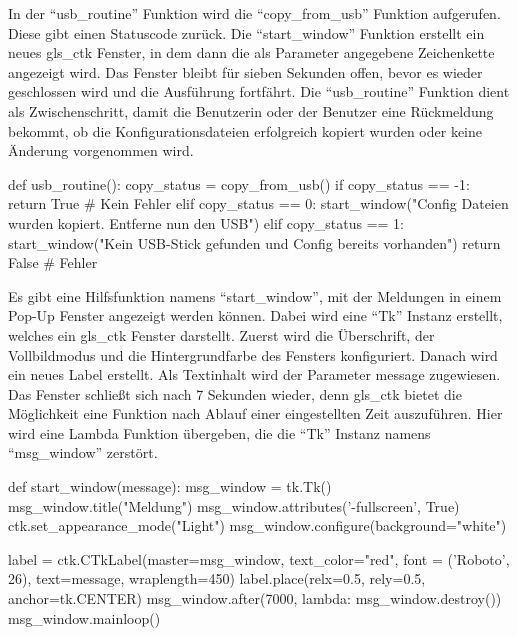 In der \enquote{usb\_routine} Funktion wird die \enquote{copy\_from\_usb} Funktion aufgerufen. Diese gibt einen Statuscode zurück. Die \enquote{start\_window} Funktion erstellt ein neues \gls{gls_ctk} Fenster, in dem dann die als Parameter angegebene Zeichenkette angezeigt wird. Das Fenster bleibt für sieben Sekunden offen, bevor es wieder geschlossen wird und die Ausführung fortfährt. Die \enquote{usb\_routine} Funktion dient als Zwischenschritt, damit die Benutzerin oder der Benutzer eine Rückmeldung bekommt, ob die Konfigurationsdateien erfolgreich kopiert wurden oder keine Änderung vorgenommen wird.

\begin{pythoncode}
def usb_routine():
	copy_status = copy_from_usb()
	if copy_status == -1:
		return True # Kein Fehler
	elif copy_status == 0:
		start_window("Config Dateien wurden kopiert. Entferne nun den USB")   
	elif copy_status == 1: 
		start_window("Kein USB-Stick gefunden und Config bereits vorhanden")  
	return False # Fehler
\end{pythoncode}

Es gibt eine Hilfsfunktion namens \enquote{start\_window}, mit der Meldungen in einem Pop-Up Fenster angezeigt werden können. Dabei wird eine \enquote{Tk} Instanz erstellt, welches ein \gls{gls_ctk} Fenster darstellt. Zuerst wird die Überschrift, der Vollbildmodus und die Hintergrundfarbe des Fensters konfiguriert. Danach wird ein neues Label erstellt. Als Textinhalt wird der Parameter message zugewiesen. Das Fenster schließt sich nach 7 Sekunden wieder, denn \gls{gls_ctk} bietet die Möglichkeit eine Funktion nach Ablauf einer eingestellten Zeit auszuführen. Hier wird eine Lambda Funktion übergeben, die die \enquote{Tk} Instanz namens \enquote{msg\_window} zerstört.
\begin{pythoncode}
def start_window(message):
	msg_window = tk.Tk()
	msg_window.title("Meldung")
	msg_window.attributes('-fullscreen', True)	
	ctk.set_appearance_mode("Light")
	msg_window.configure(background="white")
	
	label = ctk.CTkLabel(master=msg_window, text_color="red", font = ('Roboto', 26), text=message, wraplength=450)
	label.place(relx=0.5, rely=0.5, anchor=tk.CENTER)
	msg_window.after(7000, lambda: msg_window.destroy())
	msg_window.mainloop()
\end{pythoncode}

